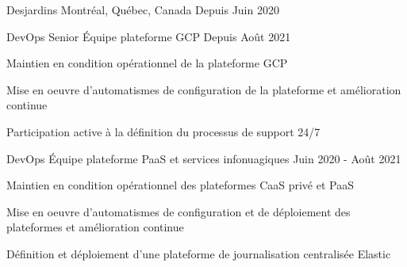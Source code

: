 

\begin{cventries}

  \cventry
    {} %
    {Desjardins} %
    {Montréal, Québec, Canada} %
    {Depuis Juin 2020} %
    {
      \begin{cvsubentries}
        \cvsubentry
          {DevOps Senior}
          {Équipe plateforme GCP}
          {Depuis Août 2021}
          {
            \begin{cvitems} %
              \item {Maintien en condition opérationnel de la plateforme GCP}
              \item {Mise en oeuvre d'automatismes de configuration de la plateforme et amélioration continue}
              \item {Participation active à la définition du processus de support 24/7}
            \end{cvitems}
          }
        \cvsubentry
          {DevOps}
          {Équipe plateforme PaaS et services infonuagiques}
          {Juin 2020 - Août 2021}
          {
            \begin{cvitems} %
              \item {Maintien en condition opérationnel des plateformes CaaS privé et PaaS}
              \item {Mise en oeuvre d'automatismes de configuration et de déploiement des plateformes et amélioration continue}
              \item {Définition et déploiement d'une plateforme de journalisation centralisée Elastic}
            \end{cvitems}
          }
      \end{cvsubentries}
    }


\end{cventries}
